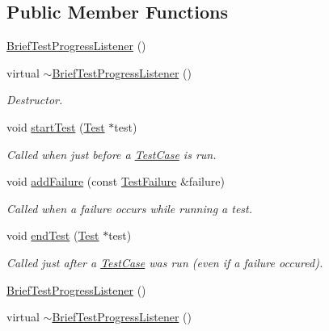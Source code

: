 \subsection*{Public Member Functions}
\begin{DoxyCompactItemize}
\item 
\hyperlink{class_brief_test_progress_listener_a10519755447b682a9619ede0577c0b53}{Brief\+Test\+Progress\+Listener} ()
\item 
\hypertarget{class_brief_test_progress_listener_a99f95b0f681937355934d667db2b89da}{virtual \hyperlink{class_brief_test_progress_listener_a99f95b0f681937355934d667db2b89da}{$\sim$\+Brief\+Test\+Progress\+Listener} ()}\label{class_brief_test_progress_listener_a99f95b0f681937355934d667db2b89da}

\begin{DoxyCompactList}\small\item\em Destructor. \end{DoxyCompactList}\item 
\hypertarget{class_brief_test_progress_listener_ab4196e15752bb2be443e72418500e20e}{void \hyperlink{class_brief_test_progress_listener_ab4196e15752bb2be443e72418500e20e}{start\+Test} (\hyperlink{class_test}{Test} $\ast$test)}\label{class_brief_test_progress_listener_ab4196e15752bb2be443e72418500e20e}

\begin{DoxyCompactList}\small\item\em Called when just before a \hyperlink{class_test_case}{Test\+Case} is run. \end{DoxyCompactList}\item 
void \hyperlink{class_brief_test_progress_listener_a21f8658a9c19c67220241656cfad30ce}{add\+Failure} (const \hyperlink{class_test_failure}{Test\+Failure} \&failure)
\begin{DoxyCompactList}\small\item\em Called when a failure occurs while running a test. \end{DoxyCompactList}\item 
\hypertarget{class_brief_test_progress_listener_a49cbd9152ea35a21f6525773660ee119}{void \hyperlink{class_brief_test_progress_listener_a49cbd9152ea35a21f6525773660ee119}{end\+Test} (\hyperlink{class_test}{Test} $\ast$test)}\label{class_brief_test_progress_listener_a49cbd9152ea35a21f6525773660ee119}

\begin{DoxyCompactList}\small\item\em Called just after a \hyperlink{class_test_case}{Test\+Case} was run (even if a failure occured). \end{DoxyCompactList}\item 
\hyperlink{class_brief_test_progress_listener_a7af12547b437fcddab52e7b0f0d47782}{Brief\+Test\+Progress\+Listener} ()
\item 
\hypertarget{class_brief_test_progress_listener_a9e1cf4460bdb460e14009d1629454881}{virtual \hyperlink{class_brief_test_progress_listener_a9e1cf4460bdb460e14009d1629454881}{$\sim$\+Brief\+Test\+Progress\+Listener} ()}\label{class_brief_test_progress_listener_a9e1cf4460bdb460e14009d1629454881}


\end{DoxyCompactItemize}
